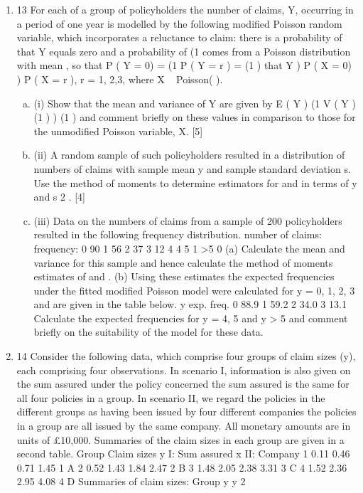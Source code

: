 \documentclass[a4paper,12pt]{article}
\begin{document}
\begin{enumerate}
\item 13
For each of a group of policyholders the number of claims, Y, occurring in a period of
one year is modelled by the following modified Poisson random variable, which
incorporates a reluctance to claim:
there is a probability of that Y equals zero and a probability of (1
comes from a Poisson distribution with mean , so that
P ( Y = 0) =
(1
P ( Y = r ) = (1
) that Y
) P ( X = 0)
) P ( X = r ), r = 1, 2,3,
where X ~ Poisson( ).
\begin{enumerate}[(a)]
\item (i)
Show that the mean and variance of Y are given by
E ( Y ) (1
V ( Y ) (1
)
) (1
)
and comment briefly on these values in comparison to those for the
unmodified Poisson variable, X.
[5]
\item (ii) A random sample of such policyholders resulted in a distribution of numbers
of claims with sample mean y and sample standard deviation s. Use the
method of moments to determine estimators for and in terms of y and s 2 .
[4]
\item (iii) Data on the numbers of claims from a sample of 200 policyholders resulted in
the following frequency distribution.
number of claims:
frequency:
0
90
1
56
2
37
3
12
4
4
5
1
>5
0
(a) Calculate the mean and variance for this sample and hence calculate
the method of moments estimates of and .
(b) Using these estimates the expected frequencies under the fitted
modified Poisson model were calculated for y = 0, 1, 2, 3 and are given
in the table below.
y exp. freq.
0 88.9
1 59.2
2 34.0
3 13.1
Calculate the expected frequencies for y = 4, 5 and y > 5 and comment
briefly on the suitability of the model for these data.
\end{enumerate}
\item 14
Consider the following data, which comprise four groups of claim sizes (y), each
comprising four observations. In scenario I, information is also given on the sum
assured under the policy concerned the sum assured is the same for all four
policies in a group. In scenario II, we regard the policies in the different groups as
having been issued by four different companies
the policies in a group are all
issued by the same company.
All monetary amounts are in units of £10,000. Summaries of the claim sizes in each
group are given in a second table.
Group
Claim sizes y
I: Sum assured x
II: Company
1
0.11 0.46
0.71 1.45
1
A
2
0.52 1.43
1.84 2.47
2
B
3
1.48 2.05
2.38 3.31
3
C
4
1.52 2.36
2.95 4.08
4
D
Summaries of claim sizes:
Group
y
y 2

\end{enumerate}
\end{document}
